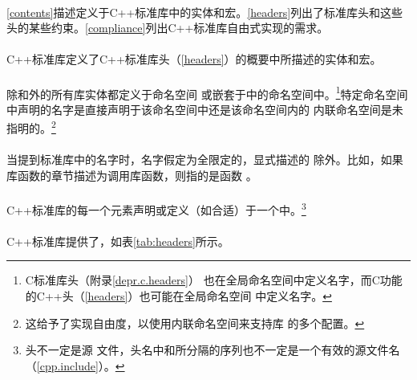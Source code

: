 \paragraph{}
\ref{contents}描述定义于C++标准库中的实体和宏。\ref{headers}列出了标准库头和这些
头的某些约束。\ref{compliance}列出C++标准库自由式实现的需求。

\paragraph{}
C++标准库定义了C++标准库头（\ref{headers}）的概要中所描述的实体和宏。

\paragraph{}
除和外的所有库实体都定义于命名空间
或嵌套于中的命名空间中。\footnote{C标准库头（附录\ref{depr.c.headers}）
也在全局命名空间中定义名字，而C功能的C++头（\ref{headers}）也可能在全局命名空间
中定义名字。}特定命名空间中声明的名字是直接声明于该命名空间中还是该命名空间内的
内联命名空间是未指明的。\footnote{这给予了实现自由度，以使用内联命名空间来支持库
的多个配置。}

\paragraph{}
当提到标准库中的名字时，名字假定为全限定的，显式描述的
除外。比如，如果库函数的章节描述为调用库函数，则指的是函数
。

\paragraph{}
C++标准库的每一个元素声明或定义（如合适）于一个中。\footnote{头不一定是源
文件，头名中\tm{<}和\tm{>}所分隔的序列也不一定是一个有效的源文件名
（\ref{cpp.include}）。}

\paragraph{}
C++标准库提供了，如表\ref{tab:headers}所示。

